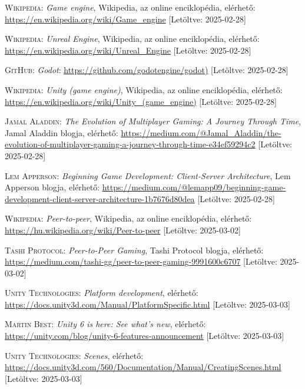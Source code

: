 \documentclass[]{thesis-ekf}
\theoremstyle{definition}
\theoremstyle{remark}
\begin{document}
\begin{thebibliography}{2}
	\textsc{Wikipedia}: \emph{Game engine}, Wikipedia, az online enciklopédia, elérhető: \url{https://en.wikipedia.org/wiki/Game_engine} [Letöltve: 2025-02-28]
	
	\textsc{Wikipedia}: \emph{Unreal Engine}, Wikipedia, az online enciklopédia, elérhető: \url{https://en.wikipedia.org/wiki/Unreal_Engine} [Letöltve: 2025-02-28]
	
	\textsc{GitHub}: \emph{Godot}: \url{https://github.com/godotengine/godot)} [Letöltve: 2025-02-28]
	
	\textsc{Wikipedia}: \emph{Unity (game engine)}, Wikipedia, az online enciklopédia, elérhető: \url{https://en.wikipedia.org/wiki/Unity_(game_engine)} [Letöltve: 2025-02-28]
	
	\textsc{Jamal Aladdin}: \emph{The Evolution of Multiplayer Gaming: A Journey Through Time}, Jamal Aladdin blogja, elérhető:
	\url{https://medium.com/@Jamal_Aladdin/the-evolution-of-multiplayer-gaming-a-journey-through-time-e34ef59294c2} [Letöltve: 2025-02-28]
	
	\textsc{Lem Apperson}: \emph{Beginning Game Development: Client-Server Architecture}, Lem Apperson blogja, elérhető:
	\url{https://medium.com/@lemapp09/beginning-game-development-client-server-architecture-1b7676d80dea} [Letöltve: 2025-02-28]
	
	\textsc{Wikipedia}: \emph{Peer-to-peer}, Wikipedia, az online enciklopédia, elérhető: \url{https://hu.wikipedia.org/wiki/Peer-to-peer} [Letöltve: 2025-03-02]
	
	\textsc{Tashi Protocol}: \emph{Peer-to-Peer Gaming}, Tashi Protocol blogja, elérhető:
	\url{https://medium.com/tashi-gg/peer-to-peer-gaming-9991600c6707} [Letöltve: 2025-03-02]
	
	\textsc{Unity Technologies}: \emph{Platform development}, elérhető:
	\url{https://docs.unity3d.com/Manual/PlatformSpecific.html} [Letöltve: 2025-03-03]
	
	\textsc{Martin Best}: \emph{Unity 6 is here: See what's new}, elérhető:
	\url{https://unity.com/blog/unity-6-features-announcement} [Letöltve: 2025-03-03]
	
	\textsc{Unity Technologies}: \emph{Scenes}, elérhető:
	\url{https://docs.unity3d.com/560/Documentation/Manual/CreatingScenes.html} [Letöltve: 2025-03-03]
	

\end{thebibliography}
\end{document}

